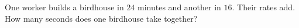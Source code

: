 One worker builds a birdhouse in $24$ minutes and another in $16$. Their rates add. How many seconds does one birdhouse take together?
